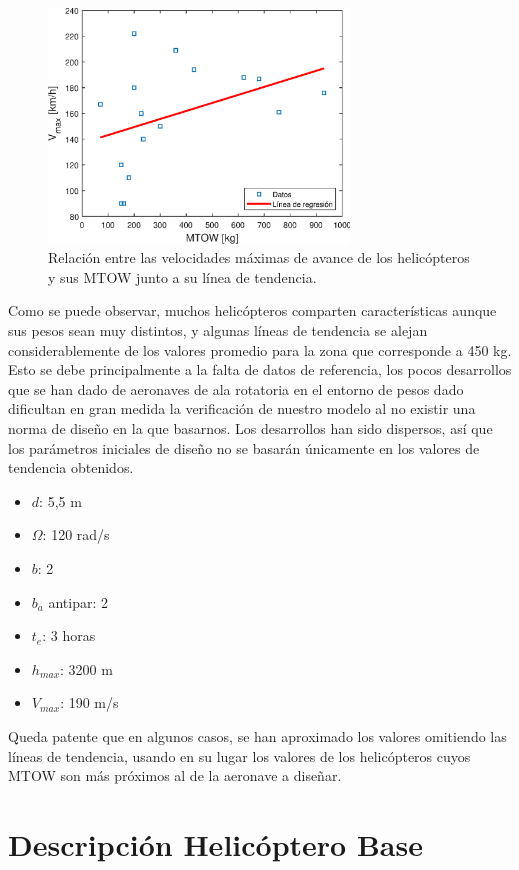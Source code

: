 \begin{figure}
	\centering
	\includegraphics[width=80mm]{graficos/analv}
	\caption{Relación entre las velocidades máximas de avance de los helicópteros y sus MTOW junto a su línea de tendencia.}
	\label{vAS}
\end{figure}

Como se puede observar, muchos helicópteros comparten características aunque sus pesos sean muy distintos, y algunas líneas de tendencia se alejan considerablemente de los valores promedio para la zona que corresponde a 450 kg. Esto se debe principalmente a la falta de datos de referencia, los pocos desarrollos que se han dado de aeronaves de ala rotatoria en el entorno de pesos dado dificultan en gran medida la verificación de nuestro modelo al no existir una norma de diseño en la que basarnos. Los desarrollos han sido dispersos, así que los parámetros iniciales de diseño no se basarán únicamente en los valores de tendencia obtenidos.
 
\begin{itemize}
	\item $d$: 5,5 m
	\item $\Omega$: 120 rad/s
	\item $b$: 2
	\item $b_{a}$ antipar: 2
	\item $t_{e}$: 3 horas
	\item $h_{max}$: 3200 m
	\item $V_{max}$: 190 m/s
\end{itemize}

Queda patente que en algunos casos, se han aproximado los valores omitiendo las líneas de tendencia, usando en su lugar los valores de los helicópteros cuyos MTOW son más próximos al de la aeronave a diseñar.

\section{Descripción Helicóptero Base}

